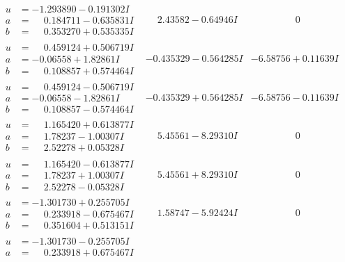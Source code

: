 \documentclass[1p]{elsarticle_modified}
\theoremstyle{definition}
\begin{document}
$$\begin{array}{c|c|c}
 \hline 
\begin{aligned}
u &= -1.293890 - 0.191302 I \\
a &= \phantom{-}0.184711 - 0.635831 I \\
b &= \phantom{-}0.353270 + 0.535335 I\end{aligned}
 & \phantom{-}2.43582 - 0.64946 I & \phantom{-0.000000 } 0 \\ \hline\begin{aligned}
u &= \phantom{-}0.459124 + 0.506719 I \\
a &= -0.06558 + 1.82861 I \\
b &= \phantom{-}0.108857 + 0.574464 I\end{aligned}
 & -0.435329 - 0.564285 I & -6.58756 + 0.11639 I \\ \hline\begin{aligned}
u &= \phantom{-}0.459124 - 0.506719 I \\
a &= -0.06558 - 1.82861 I \\
b &= \phantom{-}0.108857 - 0.574464 I\end{aligned}
 & -0.435329 + 0.564285 I & -6.58756 - 0.11639 I \\ \hline\begin{aligned}
u &= \phantom{-}1.165420 + 0.613877 I \\
a &= \phantom{-}1.78237 - 1.00307 I \\
b &= \phantom{-}2.52278 + 0.05328 I\end{aligned}
 & \phantom{-}5.45561 - 8.29310 I & \phantom{-0.000000 } 0 \\ \hline\begin{aligned}
u &= \phantom{-}1.165420 - 0.613877 I \\
a &= \phantom{-}1.78237 + 1.00307 I \\
b &= \phantom{-}2.52278 - 0.05328 I\end{aligned}
 & \phantom{-}5.45561 + 8.29310 I & \phantom{-0.000000 } 0 \\ \hline\begin{aligned}
u &= -1.301730 + 0.255705 I \\
a &= \phantom{-}0.233918 - 0.675467 I \\
b &= \phantom{-}0.351604 + 0.513151 I\end{aligned}
 & \phantom{-}1.58747 - 5.92424 I & \phantom{-0.000000 } 0 \\ \hline\begin{aligned}
u &= -1.301730 - 0.255705 I \\
a &= \phantom{-}0.233918 + 0.675467 I \\

\end{aligned}
\end{array}$$
\end{document}
